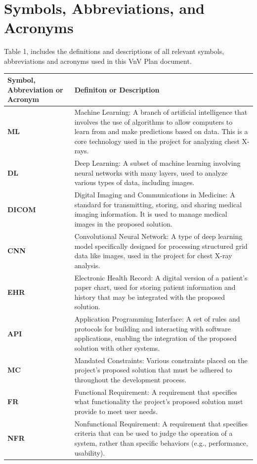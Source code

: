 \documentclass[12pt, titlepage]{article}
\begin{document}
\section{Symbols, Abbreviations, and Acronyms}

Table 1, includes the definitions and descriptions of all relevant symbols,
abbreviations and acronyms used in this VnV Plan document.

\begin{longtable}[c]{|p{}|p{}|}
  \hline
  \textbf{Symbol, Abbreviation or Acronym} & \textbf{Definiton or Description} \\ \hline
  \textbf{ML} & Machine Learning: A branch of artificial intelligence that involves the use of algorithms to allow computers to learn from and make predictions based on data. This is a core technology used in the project for analyzing chest X-rays. \\ \hline
  \textbf{DL} & Deep Learning: A subset of machine learning involving neural networks with many layers, used to analyze various types of data, including images. \\ \hline
  \textbf{DICOM} & Digital Imaging and Communications in Medicine: A standard for transmitting, storing, and sharing medical imaging information. It is used to manage medical images in the proposed solution. \\ \hline
  \textbf{CNN} & Convolutional Neural Network: A type of deep learning model specifically designed for processing structured grid data like images, used in the project for chest X-ray analysis. \\ \hline
  \textbf{EHR} & Electronic Health Record: A digital version of a patient's paper chart, used for storing patient information and history that may be integrated with the proposed solution. \\ \hline
  \textbf{API} & Application Programming Interface: A set of rules and protocols for building and interacting with software applications, enabling the integration of the proposed solution with other systems. \\ \hline
  \textbf{MC} & Mandated Constraints: Various constraints placed on the project's proposed solution that must be adhered to throughout the development process. \\ \hline
  \textbf{FR} & Functional Requirement: A requirement that specifies what functionality the project's proposed solution must provide to meet user needs. \\ \hline
  \textbf{NFR} & Nonfunctional Requirement: A requirement that specifies criteria that can be used to judge the operation of a system, rather than specific behaviors (e.g., performance, usability). \\ \hline

\end{longtable}
\end{document}
